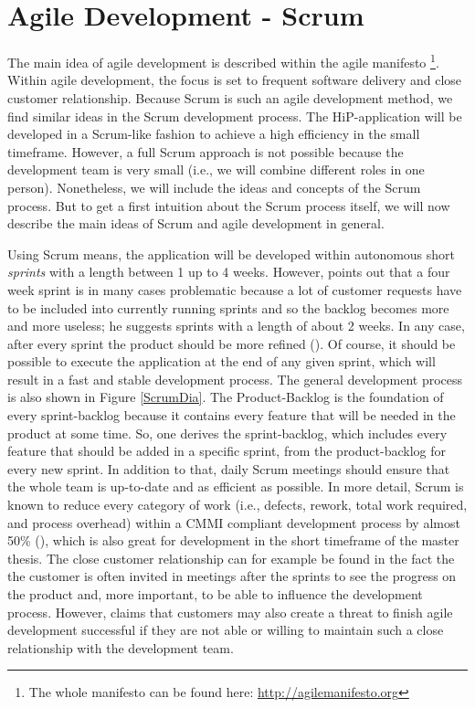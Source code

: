 \section{Agile Development - Scrum}
\label{SCRUM-intro}
The main idea of agile development is described within the agile manifesto \cite{Beck2001agile}\footnote{The whole manifesto can be found here: \url{http://agilemanifesto.org}}. Within agile development, the focus is set to frequent software delivery and close customer relationship. Because Scrum is such an agile development method, we find similar ideas in the Scrum development process. The HiP-application will be developed in a Scrum-like fashion to achieve a high efficiency in the small timeframe. However, a full Scrum approach is not possible because the development team is very small (i.e.,  we will combine different roles in one person). Nonetheless, we will include the ideas and concepts of the Scrum process. But to get a first intuition about the Scrum process itself, we will now describe the main ideas of Scrum and agile development in general.

Using Scrum means, the application will be developed within autonomous short \textit{sprints} with a length between 1 up to 4 weeks. However, \cite{Ber07} points out that a four week sprint is in many cases problematic because a lot of customer requests have to be included into currently running sprints and so the backlog becomes more and more useless; he suggests sprints with a length of about 2 weeks. In any case, after every sprint the product should be more refined (\cite{scrum}). Of course, it should be possible to execute the application at the end of any given sprint, which will result in a fast and stable development process. The general development process is also shown in Figure \ref{ScrumDia}. The Product-Backlog is the foundation of every sprint-backlog because it contains every feature that will be needed in the product at some time. So, one derives the sprint-backlog, which includes every feature that should be added in a specific sprint, from the product-backlog for every new sprint. In addition to that, daily Scrum meetings should ensure that the whole team is up-to-date and as efficient as possible. In more detail, Scrum is known to reduce every category of work (i.e., defects, rework, total work required, and process overhead) within a \ac{CMMI} compliant development process by almost 50\% (\cite{Sut09}), which is also great for development in the short timeframe of the master thesis. The close customer relationship can for example be found in the fact the the customer is often invited in meetings after the sprints to see the progress on the product and, more important, to be able to influence the development process. However, \cite{paulk2002agile} claims that customers may also create a threat to finish agile development successful if they are not able or willing to maintain such a close relationship with the development team.

